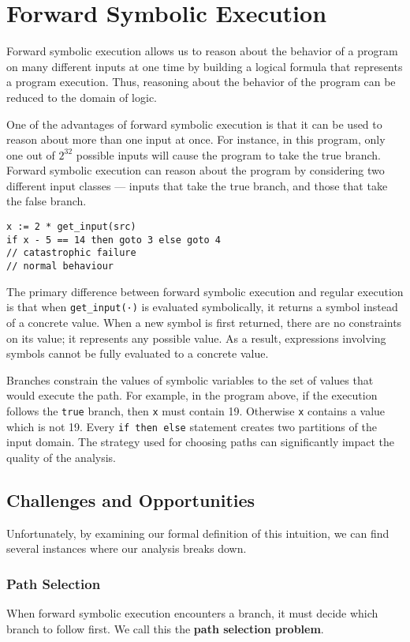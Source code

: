 \section{Forward Symbolic Execution} 
Forward symbolic execution allows us to reason about the behavior of a program on many different inputs at one time by building a logical formula that represents a program execution. Thus, reasoning about the behavior of the program can be reduced to the domain of logic.

One of the advantages of forward symbolic execution is that it can be used to reason about more than one input at once. For instance, in this program, only one out of $2^{32}$ possible inputs will cause the program to take the true branch. Forward symbolic execution can reason about the program by considering two different input classes — inputs that take the true branch, and those that take the false branch.

\begin{lstlisting}
x := 2 * get_input(src)
if x - 5 == 14 then goto 3 else goto 4
// catastrophic failure
// normal behaviour
\end{lstlisting}

The primary difference between forward symbolic execution and regular execution is that when \texttt{get\_input(·)} is evaluated symbolically, it returns a symbol instead of a concrete value. When a new symbol is first returned, there are no constraints on its value; it represents any possible value. As a result, expressions involving symbols cannot be fully evaluated to a concrete value.

Branches constrain the values of symbolic variables to the set of values that would execute the path. For example, in the program above, if the execution follows the \texttt{true} branch, then \texttt{x} must contain 19. Otherwise \texttt{x} contains a value which is not 19. Every \texttt{if then else} statement creates two partitions of the input domain. The strategy used for choosing paths can significantly impact the quality of the analysis.

\subsection{Challenges and Opportunities}
Unfortunately, by examining our formal definition of this intuition, we can find several instances where our analysis breaks down.

\subsubsection{Path Selection} 
When forward symbolic execution encounters a branch, it must decide which branch to follow first. We call this the \textbf{path selection problem}.

